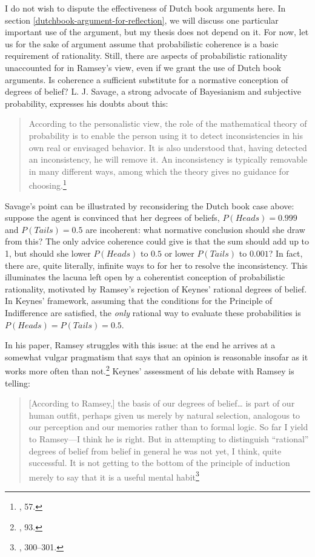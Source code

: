 I do not wish to dispute the effectiveness of Dutch book arguments here. In section \ref{dutchbook-argument-for-reflection}, we will discuss one particular important use of the argument, but my thesis does not depend on it.
For now, let us for the sake of argument assume that probabilistic coherence is a
basic requirement of rationality. Still, there are aspects of probabilistic rationality  unaccounted for in Ramsey's view, even
if we grant the use of Dutch book arguments. Is coherence a
sufficient substitute for a normative conception of degrees of belief?
L. J. Savage, a strong advocate of Bayesianism and subjective
probability, expresses his doubts about this:

\begin{quote}
According to the personalistic view, the role of the mathematical theory
of probability is to enable the person using it to detect
inconsistencies in his own real or envisaged behavior. It is also
understood that, having detected an inconsistency, he will remove it. An
inconsistency is typically removable in many different ways, among which
the theory gives no guidance for choosing.\footnote{\cite{savage}, 57.}
\end{quote}

Savage's point can be illustrated by reconsidering the Dutch book case
above: suppose the agent is convinced that her degrees of beliefs,
\(P(Heads) = 0.999\) and \(P(Tails) = 0.5\) are incoherent: what
normative conclusion should she draw from this? The only advice coherence
could give is that the sum should add up to 1, but should she lower
\(P(Heads)\) to \(0.5\) or lower \(P(Tails)\) to \(0.001\)? In fact,
there are, quite literally, infinite ways to for her to resolve the
inconsistency. This illuminates the lacuna left open by a coherentist conception of probabilistic rationality, motivated by Ramsey's rejection of Keynes' rational degrees
of belief. In Keynes' framework, assuming that the conditions for the
Principle of Indifference are satisfied, the \emph{only} rational way to
evaluate these probabilities is \(P(Heads) = P(Tails) = 0.5\).

In his paper, Ramsey struggles with this issue: at the end he arrives at
a somewhat vulgar pragmatism that says that an opinion is reasonable
insofar as it works more often than not.\footnote{\cite{ramsey}, 93.} 
Keynes' assessment of his debate
with Ramsey is telling:

\begin{quote}
{[}According to Ramsey,{]} the basis of our degrees of belief\ldots{} is
part of our human outfit, perhaps given us merely by natural selection,
analogous to our perception and our memories rather than to formal
logic. So far I yield to Ramsey---I think he is right. But in attempting
to distinguish ``rational'' degrees of belief from belief in general he
was not yet, I think, quite successful. It is not getting to the bottom
of the principle of induction merely to say that it is a useful mental
habit\footnote{\cite{keynesbio}, 300--301.}
\end{quote}

